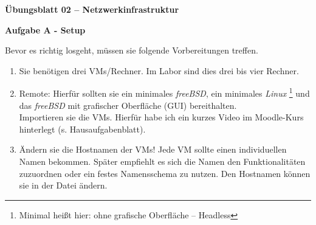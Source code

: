 \documentclass[paper=a4,fontsize=11pt]{scrartcl}%
\begin{document}
\begin{center}
\Large{\textbf{Übungsblatt 02 -- Netzwerkinfrastruktur}}\\
\end{center}

\begin{center}\Large{\textbf{Aufgabe A - Setup}}\end{center}
Bevor es richtig losgeht, müssen sie folgende Vorbereitungen treffen.
\begin{enumerate}
	\item Sie benötigen drei VMs/Rechner. Im Labor sind dies drei bis vier Rechner.
	\item Remote: Hierfür sollten sie ein minimales \emph{freeBSD}, ein minimales \emph{Linux} \footnote{Minimal heißt hier: ohne grafische Oberfläche -- Headless} und das \emph{freeBSD} mit grafischer Oberfläche (GUI) bereithalten. \\
Importieren sie die VMs. Hierfür habe ich ein kurzes Video im Moodle-Kurs hinterlegt (s. Hausaufgabenblatt).
	\item Ändern sie die Hostnamen der VMs! Jede VM sollte einen individuellen Namen bekommen. Später empfiehlt es sich die Namen den Funktionalitäten zuzuordnen oder ein festes Namensschema zu nutzen. Den Hostnamen können sie in der Datei  ändern.
\end{enumerate}
	
\end{document}
